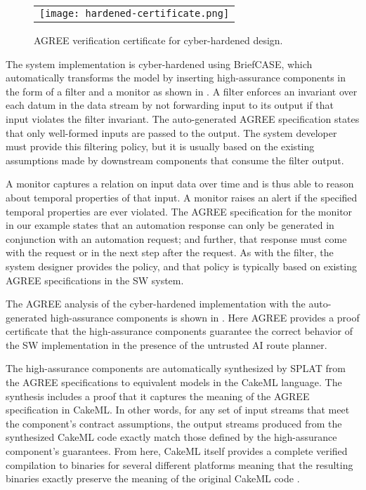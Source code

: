\begin{figure}
  \begin{center}
    \begin{tabular}{c}
      \texttt{[image: hardened-certificate.png]}
    \end{tabular}
  \end{center}
  \caption{AGREE verification certificate for cyber-hardened design.}
  \label{fig:hardened-certificate}
\end{figure}

The system implementation is cyber-hardened using BriefCASE, which automatically transforms the model by inserting high-assurance components in the form of a filter and a monitor as shown in .
A filter enforces an invariant over each datum in the data stream by not forwarding input to its output if that input violates the filter invariant.
The auto-generated AGREE specification states that only well-formed inputs are passed to the output.
The system developer must provide this filtering policy, but it is usually based on the existing assumptions made by downstream components that consume the filter output. 

A monitor captures a relation on input data over time and is thus able to reason about temporal properties of that input.
A monitor raises an alert if the specified temporal properties are ever violated.
The AGREE specification for the monitor in our example states that an automation response can only be generated in conjunction with an automation request; and further, that response must come with the request or in the next step after the request.
As with the filter, the system designer provides the policy, and that policy is typically based on existing AGREE specifications in the SW system.

The AGREE analysis of the cyber-hardened implementation with the auto-generated high-assurance components is shown in .
Here AGREE provides a proof certificate that the high-assurance components guarantee the correct behavior of the SW implementation in the presence of the untrusted AI route planner.

The high-assurance components are automatically synthesized by SPLAT from the AGREE specifications to equivalent models in the CakeML language.
The synthesis includes a proof that it captures the meaning of the AGREE specification in CakeML.
In other words, for any set of input streams that meet the component's contract assumptions, the output streams produced from the synthesized CakeML code exactly match those defined by the high-assurance component's guarantees. 
From here, CakeML itself provides a complete verified compilation to binaries for several different platforms meaning that the resulting binaries exactly preserve the meaning of the original CakeML code \cite{cakeml}. 

